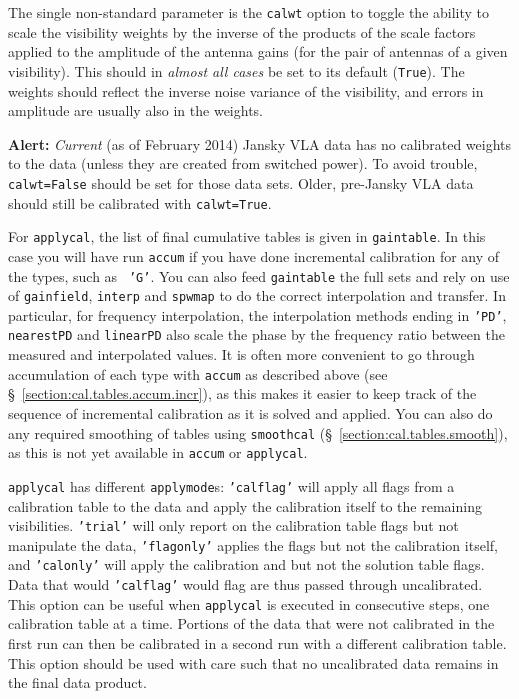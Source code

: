 The single non-standard parameter is the {\tt calwt} option to toggle
the ability to scale the visibility weights by the inverse of the 
products of the scale factors applied to the amplitude of the antenna
gains (for the pair of antennas of a given visibility).  
This should in {\em almost all cases} be set to its default ({\tt True}).
The weights should reflect the inverse noise variance of the
visibility, and errors in amplitude are usually also in the weights.


{\bf Alert:} {\it Current} (as of February 2014) Jansky VLA data has no
calibrated weights to the data (unless they are created from switched
power). To avoid trouble, {\tt calwt=False} should be set for those
data sets. Older, pre-Jansky VLA data should still be calibrated with
{\tt calwt=True}.

For {\tt applycal}, the list of final cumulative tables is given in
{\tt gaintable}.  In this case you will have run {\tt accum} if you
have done incremental calibration for any of the types, such as {\tt
  'G'}.  You can also feed {\tt gaintable} the full sets and rely on
use of {\tt gainfield}, {\tt interp} and {\tt spwmap} to do the
correct interpolation and transfer.  In particular, for frequency
interpolation, the interpolation methods ending in {\tt 'PD'}, {\tt
  nearestPD} and {\tt linearPD} also scale the phase by the frequency
ratio between the measured and interpolated values. It is often more
convenient to go through accumulation of each type with {\tt accum} as
described above (see \S~\ref{section:cal.tables.accum.incr}), as this
makes it easier to keep track of the sequence of incremental
calibration as it is solved and applied.  You can also do any required
smoothing of tables using {\tt smoothcal}
(\S~\ref{section:cal.tables.smooth}), as this is not yet available in
{\tt accum} or {\tt applycal}.


{\tt applycal} has different {\tt applymode}s: {\tt 'calflag'} will
apply all flags from a calibration table to the data and apply the
calibration itself to the remaining visibilities. {\tt 'trial'} will
only report on the calibration table flags but not manipulate the
data, {\tt 'flagonly'} applies the flags but not the calibration
itself, and {\tt 'calonly'} will apply the calibration and but not the
solution table flags. Data that would {\tt 'calflag'} would flag are
thus passed through uncalibrated. This option can be useful when
{\tt applycal} is executed in consecutive steps, one calibration table
at a time. Portions of the data that were not calibrated in the first
run can then be calibrated in a second run with a different
calibration table. This option should be used with care such that no
uncalibrated data remains in the final data product. 



